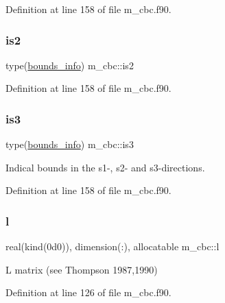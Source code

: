 Definition at line 158 of file m\+\_\+cbc.\+f90.

\mbox{\label{namespacem__cbc_acfe8efda790266c75260db5e3917d337}} 
\subsubsection{\texorpdfstring{is2}{is2}}
{\footnotesize\ttfamily type(\hyperlink{structm__derived__types_1_1bounds__info}{bounds\+\_\+info}) m\+\_\+cbc\+::is2}



Definition at line 158 of file m\+\_\+cbc.\+f90.

\mbox{\label{namespacem__cbc_a8477d940e9515138e8405c9302a026c8}} 
\subsubsection{\texorpdfstring{is3}{is3}}
{\footnotesize\ttfamily type(\hyperlink{structm__derived__types_1_1bounds__info}{bounds\+\_\+info}) m\+\_\+cbc\+::is3}



Indical bounds in the s1-\/, s2-\/ and s3-\/directions. 



Definition at line 158 of file m\+\_\+cbc.\+f90.

\mbox{\label{namespacem__cbc_a44a30ad8ee6642f20f106e99fe3608f9}} 
\subsubsection{\texorpdfstring{l}{l}}
{\footnotesize\ttfamily real(kind(0d0)), dimension(\+:), allocatable m\+\_\+cbc\+::l}



L matrix (see Thompson 1987,1990) 



Definition at line 126 of file m\+\_\+cbc.\+f90.

\mbox{\label{namespacem__cbc_a7ff1c86cd167654a9c0765dea4a93ba5}} 
